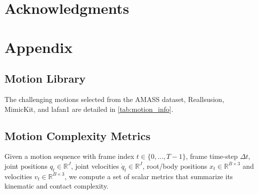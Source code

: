\section*{Acknowledgments}





\clearpage
\section*{Appendix}
\label{sec:appendix}



\subsection{\dataset Motion Library}
The challenging motions selected from the AMASS dataset, Reallsusion, MimicKit, and \ac{lafan1} are detailed in \cref{tab:motion_info}.


\subsection{Motion Complexity Metrics}
\label{sec:motion-metrics}

Given a motion sequence with frame index $t \in \{0,\dots,T-1\}$, frame time-step $\Delta t$, joint positions $q_t \in \mathbb{R}^J$, joint velocities $\dot{q}_t \in \mathbb{R}^J$, root/body positions $x_t \in \mathbb{R}^{B\times 3}$ and velocities $v_t \in \mathbb{R}^{B\times 3}$, we compute a set of scalar metrics that summarize its kinematic and contact complexity.

